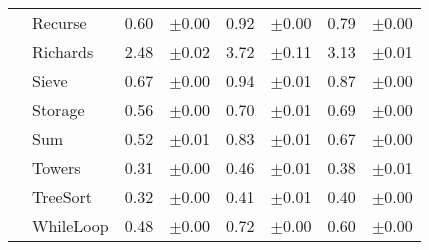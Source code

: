 \begin{tabular}{llrlrlrl}
 & Recurse & 0.60 & \scriptsize\textcolor{gray!60}{$\pm$0.00} & 0.92 & \scriptsize\textcolor{gray!60}{$\pm$0.00} & 0.79 & \scriptsize\textcolor{gray!60}{$\pm$0.00} \\
 & Richards & 2.48 & \scriptsize\textcolor{gray!60}{$\pm$0.02} & 3.72 & \scriptsize\textcolor{gray!60}{$\pm$0.11} & 3.13 & \scriptsize\textcolor{gray!60}{$\pm$0.01} \\
 & Sieve & 0.67 & \scriptsize\textcolor{gray!60}{$\pm$0.00} & 0.94 & \scriptsize\textcolor{gray!60}{$\pm$0.01} & 0.87 & \scriptsize\textcolor{gray!60}{$\pm$0.00} \\
 & Storage & 0.56 & \scriptsize\textcolor{gray!60}{$\pm$0.00} & 0.70 & \scriptsize\textcolor{gray!60}{$\pm$0.01} & 0.69 & \scriptsize\textcolor{gray!60}{$\pm$0.00} \\
 & Sum & 0.52 & \scriptsize\textcolor{gray!60}{$\pm$0.01} & 0.83 & \scriptsize\textcolor{gray!60}{$\pm$0.01} & 0.67 & \scriptsize\textcolor{gray!60}{$\pm$0.00} \\
 & Towers & 0.31 & \scriptsize\textcolor{gray!60}{$\pm$0.00} & 0.46 & \scriptsize\textcolor{gray!60}{$\pm$0.01} & 0.38 & \scriptsize\textcolor{gray!60}{$\pm$0.01} \\
 & TreeSort & 0.32 & \scriptsize\textcolor{gray!60}{$\pm$0.00} & 0.41 & \scriptsize\textcolor{gray!60}{$\pm$0.01} & 0.40 & \scriptsize\textcolor{gray!60}{$\pm$0.00} \\
 & WhileLoop & 0.48 & \scriptsize\textcolor{gray!60}{$\pm$0.00} & 0.72 & \scriptsize\textcolor{gray!60}{$\pm$0.00} & 0.60 & \scriptsize\textcolor{gray!60}{$\pm$0.00} \\
\bottomrule
\end{tabular}

